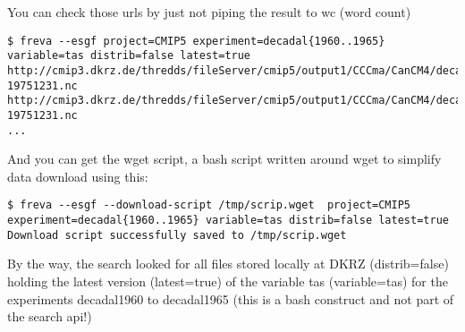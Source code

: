 \documentclass[a4paper,11pt]{ltxdoc}
\begin{document}
You can check those urls by just not piping the result to wc (word count)
\begin{verbatim}
$ freva --esgf project=CMIP5 experiment=decadal{1960..1965} variable=tas distrib=false latest=true
http://cmip3.dkrz.de/thredds/fileServer/cmip5/output1/CCCma/CanCM4/decadal1965/day/atmos/day/r10i1p1/v20120531/tas/tas_day_CanCM4_decadal1965_r10i1p1_19660101-19751231.nc
http://cmip3.dkrz.de/thredds/fileServer/cmip5/output1/CCCma/CanCM4/decadal1965/day/atmos/day/r10i2p1/v20120531/tas/tas_day_CanCM4_decadal1965_r10i2p1_19660101-19751231.nc
...
\end{verbatim}
And you can get the wget script, a bash script written around wget to simplify data download using this:
\begin{verbatim}
$ freva --esgf --download-script /tmp/scrip.wget  project=CMIP5 experiment=decadal{1960..1965} variable=tas distrib=false latest=true 
Download script successfully saved to /tmp/scrip.wget
\end{verbatim}
By the way, the search looked for all files stored locally at DKRZ (distrib=false) holding the latest version (latest=true) of the variable tas (variable=tas) for the experiments decadal1960 to decadal1965 (this is a bash construct and not part of the search api!)
\end{document}
